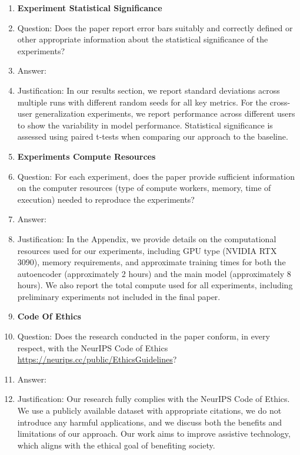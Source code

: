 \begin{enumerate}
\item {\bf Experiment Statistical Significance}
    \item[] Question: Does the paper report error bars suitably and correctly defined or other appropriate information about the statistical significance of the experiments?
    \item[] Answer: \answerYes{}
    \item[] Justification: In our results section, we report standard deviations across multiple runs with different random seeds for all key metrics. For the cross-user generalization experiments, we report performance across different users to show the variability in model performance. Statistical significance is assessed using paired t-tests when comparing our approach to the baseline.

\item {\bf Experiments Compute Resources}
    \item[] Question: For each experiment, does the paper provide sufficient information on the computer resources (type of compute workers, memory, time of execution) needed to reproduce the experiments?
    \item[] Answer: \answerYes{}
    \item[] Justification: In the Appendix, we provide details on the computational resources used for our experiments, including GPU type (NVIDIA RTX 3090), memory requirements, and approximate training times for both the autoencoder (approximately 2 hours) and the main model (approximately 8 hours). We also report the total compute used for all experiments, including preliminary experiments not included in the final paper.

\item {\bf Code Of Ethics}
    \item[] Question: Does the research conducted in the paper conform, in every respect, with the NeurIPS Code of Ethics \url{https://neurips.cc/public/EthicsGuidelines}?
    \item[] Answer: \answerYes{}
    \item[] Justification: Our research fully complies with the NeurIPS Code of Ethics. We use a publicly available dataset with appropriate citations, we do not introduce any harmful applications, and we discuss both the benefits and limitations of our approach. Our work aims to improve assistive technology, which aligns with the ethical goal of benefiting society.


\end{enumerate}
